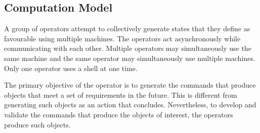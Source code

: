 \subsection{Computation Model}
\label{computation_model}

A group of operators attempt to collectively generate states that they define as favourable using multiple machines. The operators act asynchronously while communicating with each other. Multiple operators may simultaneously use the same machine and the same operator may simultaneously use multiple machines. Only one operator uses a shell at one time.

The primary objective of the operator is to generate the commands that produce objects that meet a set of requirements in the future. This is different from generating such objects as an action that concludes. Nevertheless, to develop and validate the commands that produce the objects of interest, the operators produce such objects.